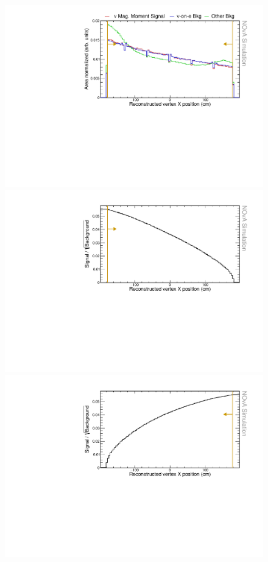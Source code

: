 \begin{figure}[hbtp]
\centering
\includegraphics[width=.9\textwidth]{Plots/NuMMEventSelection/N1Cut_vtxXActive.pdf}
\includegraphics[width=.9\textwidth]{Plots/NuMMEventSelection/NuMM_N1Cut_vtxXActiveright_FOMStats.pdf}
\includegraphics[width=.9\textwidth]{Plots/NuMMEventSelection/NuMM_N1Cut_vtxXActiveleft_FOMStats.pdf}

\end{figure}
